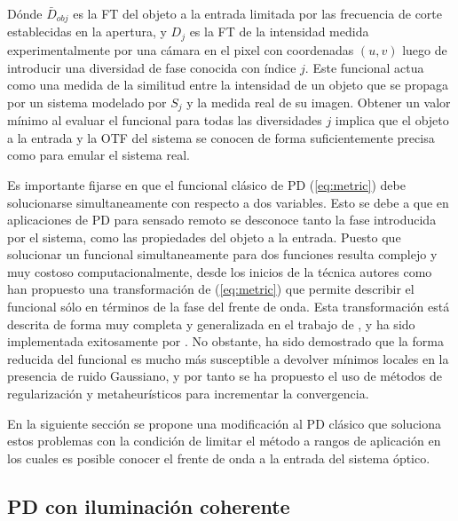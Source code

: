 Dónde $\bar{D}_{obj}$ es la FT del objeto a la entrada limitada por las frecuencia
de corte establecidas en la apertura, y $D_{j}$ es la FT de la intensidad
medida experimentalmente por una cámara en el pixel con coordenadas $(u,v)$ luego de
introducir una diversidad de fase conocida con índice $j$.      
Este funcional actua como una medida de la similitud entre la
intensidad de un objeto que se propaga por un sistema modelado por
$S_{j}$ y la medida real de su imagen. Obtener un valor mínimo al
evaluar el funcional para todas las diversidades $j$ implica que el objeto a la entrada y la OTF del
sistema se conocen de forma suficientemente precisa como para emular
el sistema real.   

Es importante fijarse en que el funcional clásico de PD
(\ref{eq:metric}) debe solucionarse simultaneamente con respecto a dos
variables. Esto se debe a que en aplicaciones de PD para sensado
remoto se desconoce tanto la fase introducida por el sistema, como las
propiedades del objeto a la entrada. Puesto que solucionar un funcional
simultaneamente para dos funciones resulta complejo y muy costoso
computacionalmente, desde los inicios de la técnica autores como  han propuesto
una transformación de (\ref{eq:metric}) que permite describir el funcional sólo en términos
de la fase del frente de onda. Esta transformación está descrita
de forma muy completa y generalizada en el trabajo de , y ha
sido implementada exitosamente por . No
obstante, ha sido demostrado que la forma reducida del funcional es
mucho más susceptible a devolver mínimos locales en la presencia de
ruido Gaussiano, y por tanto se ha propuesto el uso de métodos de
regularización y metaheurísticos para incrementar la convergencia.  

En la siguiente sección se propone una modificación al PD clásico que
soluciona estos problemas con la condición de limitar el método a
rangos de aplicación en los cuales es posible conocer el frente de
onda a la entrada del sistema óptico. 

\subsection{PD con iluminación coherente}
\label{sec:ChPD_PD_il_coherente}

